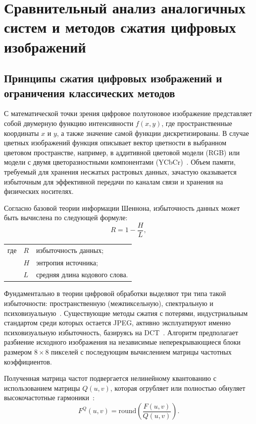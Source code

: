 \section{Сравнительный анализ аналогичных систем и методов сжатия цифровых изображений}

\subsection{Принципы сжатия цифровых изображений и ограничения классических методов}

С математической точки зрения цифровое полутоновое изображение представляет собой двумерную функцию интенсивности $f(x, y)$, где пространственные координаты $x$ и $y$, а также значение самой функции дискретизированы. В случае цветных изображений функция описывает вектор цветности в выбранном цветовом пространстве, например, в аддитивной цветовой модели (RGB) или модели с двумя цветоразностными компонентами (YCbCr)~\cite{gonzalez2012}. Объем памяти, требуемый для хранения несжатых растровых данных, зачастую оказывается избыточным для эффективной передачи по каналам связи и хранения на физических носителях.

Согласно базовой теории информации Шеннона, избыточность данных может быть вычислена по следующей формуле:
\begin{equation}
    R = 1 - \frac{H}{L},
\end{equation}
\noindent
\begin{tabularx}{\linewidth}{@{} p{2em} l @{~---~} X @{}}
где & $R$ & избыточность данных; \\
    & $H$ & энтропия источника; \\
    & $L$ & средняя длина кодового слова.
\end{tabularx}

Фундаментально в теории цифровой обработки выделяют три типа такой избыточности: пространственную (межпиксельную), спектральную и психовизуальную~\cite{salomon2004}. Существующие методы сжатия с потерями, индустриальным стандартом среди которых остается JPEG, активно эксплуатируют именно психовизуальную избыточность, базируясь на DCT~\cite{wallace1992}. Алгоритм предполагает разбиение исходного изображения на независимые неперекрывающиеся блоки размером $8 \times 8$ пикселей с последующим вычислением матрицы частотных коэффициентов.

Полученная матрица частот подвергается нелинейному квантованию с использованием матрицы $Q(u,v)$, которая огрубляет или полностью обнуляет высокочастотные гармоники~\cite{pennebaker1992}:
\begin{equation}
    F^{Q}(u, v) = \mathrm{round} \left( \frac{F(u, v)}{Q(u, v)} \right).
\end{equation}

